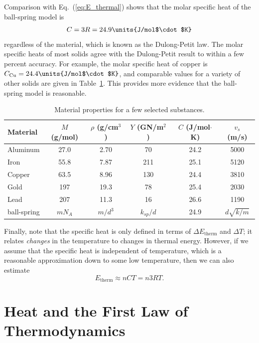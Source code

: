 Comparison with Eq.~(\ref{eq:E_thermal}) shows that the molar
specific heat of the ball-spring model is
\begin{equation}
C = 3R = 24.9\units{J/mol$\cdot$K}
\end{equation}
regardless of the material, which is known as the Dulong-Petit law.
The molar specific heats of most solids agree with the Dulong-Petit
result to within a few percent accuracy.  For example, the molar
specific heat of copper is $C_{\rm Cu} = 24.4\units{J/mol$\cdot$K}$,
and comparable values for a variety of other solids are given in
Table~\ref{table:material_properties}.
This provides more evidence that the ball-spring model is reasonable.


\begin{table}
\begin{tabular}{lccccc}
\hline\hline
Material & $M$ (g/mol) & $\rho$ (g/cm$^3$) & $Y$ (GN/m$^2$) & 
$C$ (J/mol$\cdot$K)  & $v_s$ (m/s) \\ \hline
Aluminum & 27.0 & 2.70 & 70  & 24.2  & 5000\\
Iron     & 55.8 & 7.87 & 211 & 25.1  & 5120\\
Copper   & 63.5 & 8.96 & 130 & 24.4  & 3810\\
Gold     & 197  & 19.3 & 78  & 25.4  & 2030\\
Lead     & 207  & 11.3 & 16  & 26.6  & 1190\\
ball-spring & $mN_A$ & $m/d^3$ & $k_{sp}/d$ & 24.9  &  $d\sqrt{k/m}$\\
\hline\hline
\end{tabular}
\caption{Material properties for a few selected substances.}
\label{table:material_properties}
\end{table}

Finally, note that the specific heat is only defined in terms of
$\Delta E_\text{therm}$ and $\Delta T$; it relates {\it changes} in
the temperature to changes in thermal energy.  However, if we assume
that the specific heat is independent of temperature, which is a
reasonable approximation down to some low temperature, then we can
also estimate
\begin{equation}
E_\text{therm} \approx nCT = n3RT.
\end{equation}


\section{Heat and the First Law of Thermodynamics}
\label{section:heat}

